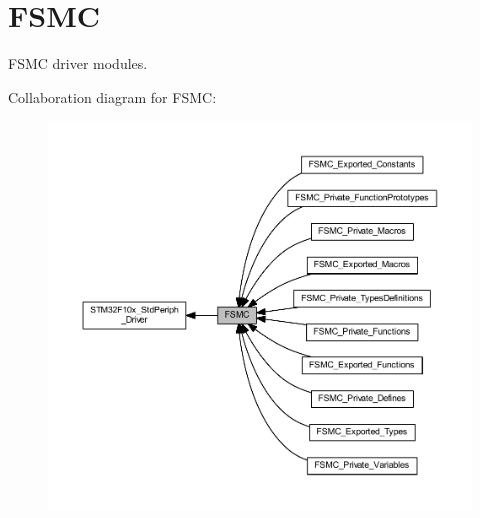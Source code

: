 \hypertarget{group___f_s_m_c}{}\section{F\+S\+MC}
\label{group___f_s_m_c}


F\+S\+MC driver modules.  


Collaboration diagram for F\+S\+MC\+:
\nopagebreak
\begin{figure}[H]
\begin{center}
\leavevmode
\includegraphics[width=350pt]{group___f_s_m_c}
\end{center}
\end{figure}
